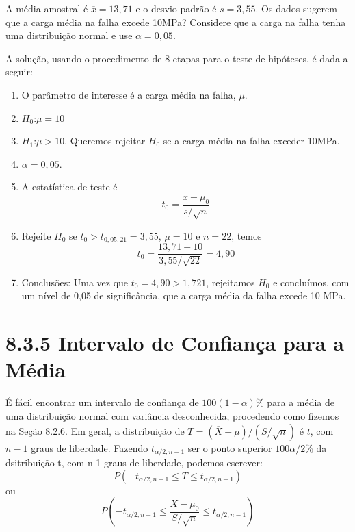 \documentclass[a4paper,12pt]{article} %
\begin{document}
	A média amostral é $ \overline{x} = 13,71  $ e o desvio-padrão é $s=3,55$. Os dados sugerem que a carga média na falha excede 10MPa? Considere que a carga na falha tenha uma distribuição normal e use $ \alpha = 0,05 $.
	
	\hspace{10pt} A solução, usando o procedimento de 8 etapas para o teste de hipóteses, é dada a seguir:
	\begin{enumerate}
		\item O parâmetro de interesse é a carga média na falha, $\mu$.
		\item $H_0$:$\mu = 10$
		\item $H_1$:$\mu > 10$. Queremos rejeitar $H_0$ se a carga média na falha exceder 10MPa.
		\item $\alpha = 0,05$.
		\item A estatística de teste é
		\begin{equation*}
			t_0 = \frac{\overline{x} - \mu_0}{s/ \sqrt{n}}
		\end{equation*}
		\item Rejeite $H_0$ se $t_0 > t_{0,05, 21} = 3,55$, $\mu = 10$ e $n=22$, temos 
		\begin{equation*}
			t_0 = \frac{13,71 - 10}{3,55 / \sqrt{22}} = 4,90
		\end{equation*}
	
		\item Conclusões: Uma vez que $ t_0 = 4,90 > 1,721 $, rejeitamos $H_0$ e concluímos, com um nível de 0,05 de significância, que a carga média da falha excede 10 MPa. 
	\end{enumerate}

	\section*{8.3.5 Intervalo de Confiança para a Média}
	É fácil encontrar um intervalo de confiança de $100(1- \alpha)\%$ para a média de uma distribuição normal com variância desconhecida, procedendo como fizemos na Seção 8.2.6. Em geral, a distribuição de $T= \left( \overline{X} - \mu \right) / \left( S/ \sqrt{n} \right)  $ é $t$, com $n-1$ graus de liberdade. Fazendo $t_{\alpha / 2, n-1}$ ser o ponto superior $100 \alpha / 2 \%$ da dsitribuição t, com n-1 graus de liberdade, podemos escrever:
	\begin{equation*}
		P\left( -t_{\alpha / 2, n-1} \leq T \leq t_{\alpha / 2, n-1} \right) 
	\end{equation*}
	ou
	\begin{equation*}
		P\left( -t_{\alpha / 2, n-1} \leq  \frac{\overline{X} - \mu_0}{S/ \sqrt{n}} \leq t_{\alpha / 2, n-1} \right) 
	\end{equation*}
\end{document}

